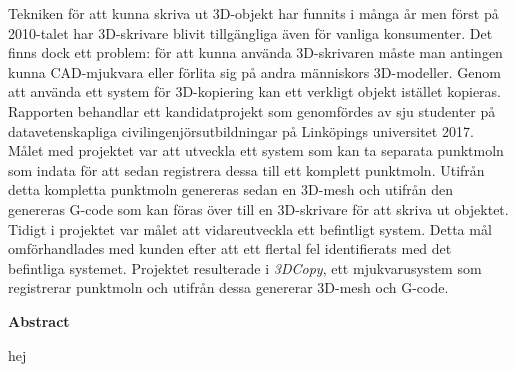 \noindent
Tekniken för att kunna skriva ut 3D-objekt har funnits i många år men först på 2010-talet har 3D-skrivare blivit tillgängliga även för vanliga konsumenter. Det finns dock ett problem: för att kunna använda 3D-skrivaren måste man antingen kunna CAD-mjukvara eller förlita sig på andra människors 3D-modeller. Genom att använda ett system för 3D-kopiering kan ett verkligt objekt istället kopieras. Rapporten behandlar ett kandidatprojekt som genomfördes av sju studenter på datavetenskapliga civilingenjörsutbildningar på Linköpings universitet 2017. Målet med projektet var att utveckla ett system som kan ta separata punktmoln som indata för att sedan registrera dessa till ett komplett punktmoln. Utifrån detta kompletta punktmoln genereras sedan en 3D-mesh och utifrån den genereras G-code som kan föras över till en 3D-skrivare för att skriva ut objektet. Tidigt i projektet var målet att vidareutveckla ett befintligt system. Detta mål omförhandlades med kunden efter att ett flertal fel identifierats med det befintliga systemet. Projektet resulterade i \textit{3DCopy}, ett mjukvarusystem som registrerar punktmoln och utifrån dessa genererar 3D-mesh och G-code.
\bigskip


\begin{center}
\textbf{Abstract}
\end{center}
\noindent
hej

